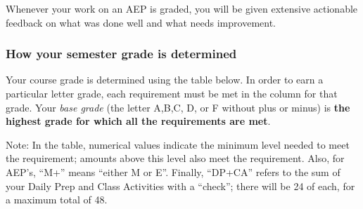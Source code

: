 \documentclass[]{article}
\begin{document}
Whenever your work on an AEP is graded, you will be given extensive
actionable feedback on what was done well and what needs improvement.

\hypertarget{how-your-semester-grade-is-determined}{%
\subsubsection{How your semester grade is
determined}\label{how-your-semester-grade-is-determined}}

Your course grade is determined using the table below. In order to earn
a particular letter grade, each requirement must be met in the column
for that grade. Your \emph{base grade} (the letter A,B,C, D, or F
without plus or minus) is \textbf{the highest grade for which all the
requirements are met}.

Note: In the table, numerical values indicate the minimum level needed
to meet the requirement; amounts above this level also meet the
requirement. Also, for AEP's, ``M+'' means ``either M or E''. Finally,
``DP+CA'' refers to the sum of your Daily Prep and Class Activities with
a ``check''; there will be 24 of each, for a maximum total of 48.
\end{document}
